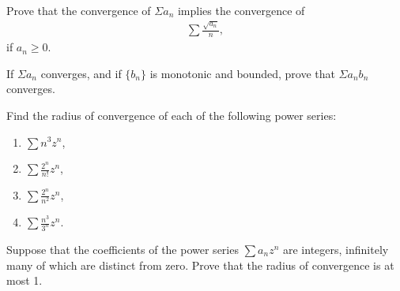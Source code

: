   \begin{exercise}[Rudin 3.7]
    Prove that the convergence of $\Sigma a_n$ implies the convergence of
    \begin{align*}
      \sum \frac{\sqrt{a_n}}{n},
    \end{align*}
    if $a_n \geq 0$.
  \end{exercise}
  \begin{solution}
    
  \end{solution}

  \begin{exercise}[Rudin 3.8]
    If $\Sigma a_n$ converges, and if $\{b_n\}$ is monotonic and bounded, prove that $\Sigma a_n b_n$ converges.
  \end{exercise}
  \begin{solution}
    
  \end{solution}

  \begin{exercise}[Rudin 3.9]
    Find the radius of convergence of each of the following power series:
    \begin{enumerate} 
      \item[(a)] $\sum n^3 z^n$,
      \item[(b)] $\sum \frac{2^n}{n!} z^n$,
      \item[(c)] $\sum \frac{2^n}{n^2} z^n$,
      \item[(d)] $\sum \frac{n^3}{3^n} z^n$.
    \end{enumerate}
  \end{exercise}
  \begin{solution}
    
  \end{solution}

  \begin{exercise}[Rudin 3.10]
    Suppose that the coefficients of the power series $\sum a_n z^n$ are integers, infinitely many of which are distinct from zero. Prove that the radius of convergence is at most 1.
  \end{exercise}
  \begin{solution}
    
  \end{solution}


